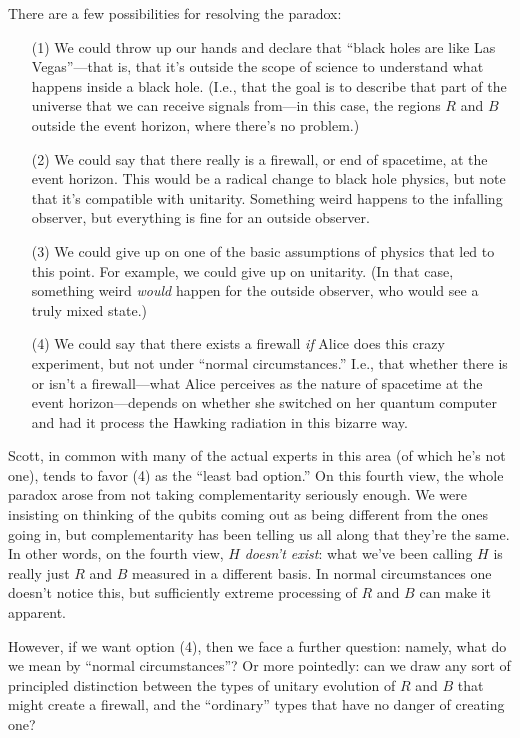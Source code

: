 \documentclass[12pt]{report}
\theoremstyle{plain}
\theoremstyle{definition}
\begin{document}
There are a few possibilities for resolving the paradox:
\begin{itemize}
\item[(1)] We could throw up our hands and declare that ``black holes are like Las Vegas''---that is, that it's outside the scope of science
to understand what happens inside a black hole.  (I.e., that the goal is to describe that part of the universe that we can receive signals from---in this case, the regions $R$ and $B$ outside the event horizon, where there's no problem.)
\item[(2)] We could say that there really is a firewall, or end of spacetime, at the event horizon.
This would be a radical change to black hole physics, but note that it's compatible with unitarity.  Something weird happens to the
infalling observer, but everything is fine for an outside observer.
\item[(3)] We could give up on one of the basic assumptions of physics that
led to this point. For example, we could give up on unitarity.
(In that case, something weird {\em would} happen for the outside observer, who would
see a truly mixed state.)
\item[(4)] We could say that there exists a firewall {\em if} Alice does this crazy experiment,
but not under ``normal circumstances.''  I.e., that whether there is or isn't a firewall---what Alice perceives as the
nature of spacetime at the event horizon---depends on whether she switched on her quantum
computer and had it process the Hawking radiation in this bizarre way.
\end{itemize}

Scott, in common with many of the actual experts in this area (of which he's not one), tends to favor (4) as the ``least bad option.''
On this fourth view, the whole paradox arose from not taking complementarity seriously enough.
We were insisting on thinking of the qubits coming out as being
different from the ones going in, but complementarity has been telling us
all along that they're the same.  In other words, on the fourth view, $H$ {\em doesn't exist}: what we've been calling
$H$ is really just $R$ and $B$ measured in a different basis.  In normal circumstances one doesn't notice this,
but sufficiently extreme processing of $R$ and $B$ can make it apparent.

However, if we want option (4), then we face a further question: namely, what do we mean by ``normal circumstances''?
Or more pointedly: can we draw any sort of principled distinction between the types of unitary evolution of $R$ and $B$ that might create a firewall,
and the ``ordinary'' types that have no danger of creating one?
\end{document}
